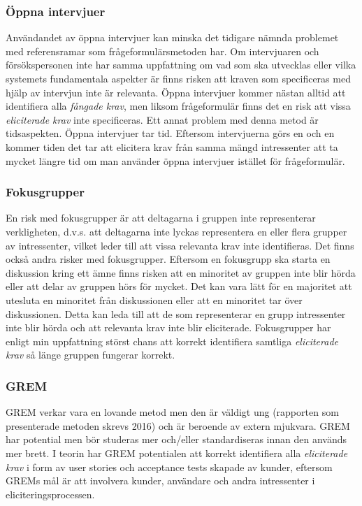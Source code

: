\subsubsection{Öppna intervjuer}
Användandet av öppna intervjuer kan minska det tidigare nämnda problemet med referensramar som frågeformulärsmetoden har. Om intervjuaren och försökspersonen inte har samma uppfattning om vad som ska utvecklas eller vilka systemets fundamentala aspekter är finns risken att kraven som specificeras med hjälp av intervjun inte är relevanta. Öppna intervjuer kommer nästan alltid att identifiera alla \textit{fångade krav}, men liksom frågeformulär finns det en risk att vissa \textit{eliciterade krav} inte specificeras. Ett annat problem med denna metod är tidsaspekten. Öppna intervjuer tar tid. Eftersom intervjuerna görs en och en kommer tiden det tar att elicitera krav från samma mängd intressenter att ta mycket längre tid om man använder öppna intervjuer istället för frågeformulär.  

\subsubsection{Fokusgrupper}
En risk med fokusgrupper är att deltagarna i gruppen inte representerar verkligheten, d.v.s. att deltagarna inte lyckas representera en eller flera grupper av intressenter, vilket leder till att vissa relevanta krav inte identifieras. Det finns också andra risker med fokusgrupper. Eftersom en fokusgrupp ska starta en diskussion kring ett ämne finns risken att en minoritet av gruppen inte blir hörda eller att delar av gruppen hörs för mycket. Det kan vara lätt för en majoritet att utesluta en minoritet från diskussionen eller att en minoritet tar över diskussionen. Detta kan leda till att de som representerar en grupp intressenter inte blir hörda och att relevanta krav inte blir eliciterade. Fokusgrupper har enligt min uppfattning störst chans att korrekt identifiera samtliga \textit{eliciterade krav} så länge gruppen fungerar korrekt.

\subsubsection{GREM}
GREM verkar vara en lovande metod men den är väldigt ung (rapporten som presenterade metoden skrevs 2016) och är beroende av extern mjukvara. GREM har potential men bör studeras mer och/eller standardiseras innan den används mer brett. I teorin har GREM potentialen att korrekt identifiera alla \textit{eliciterade krav} i form av user stories och acceptance tests skapade av kunder, eftersom GREMs mål är att involvera kunder, användare och andra intressenter i eliciteringsprocessen.

